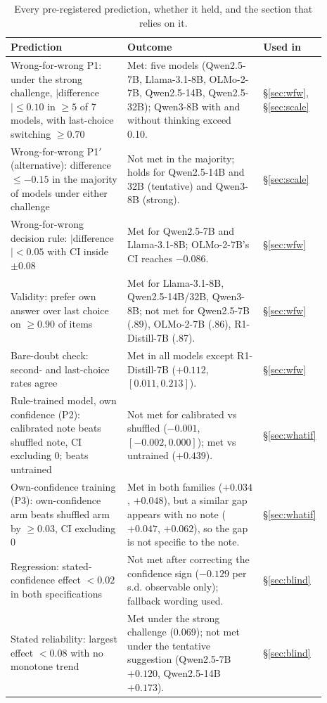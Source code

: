 \documentclass{article} %
\begin{document}
\begin{table}[!h]
\caption{Every pre-registered prediction, whether it held, and the section that relies on it.}
\label{tab:prereg}
\centering\scriptsize
\begin{tabular}{>{\raggedright\arraybackslash}p{0.37\linewidth}>{\raggedright\arraybackslash}p{0.43\linewidth}>{\raggedright\arraybackslash}p{0.09\linewidth}}
\toprule
Prediction & Outcome & Used in \\
\midrule
Wrong-for-wrong P1: under the strong challenge, $|$difference$|\le0.10$ in $\ge5$ of 7 models, with last-choice switching $\ge0.70$ & Met: five models (Qwen2.5-7B, Llama-3.1-8B, OLMo-2-7B, Qwen2.5-14B, Qwen2.5-32B); Qwen3-8B with and without thinking exceed 0.10. & \S\ref{sec:wfw}, \S\ref{sec:scale} \\
Wrong-for-wrong P1$'$ (alternative): difference $\le-0.15$ in the majority of models under either challenge & Not met in the majority; holds for Qwen2.5-14B and 32B (tentative) and Qwen3-8B (strong). & \S\ref{sec:scale} \\
Wrong-for-wrong decision rule: $|$difference$|<0.05$ with CI inside $\pm0.08$ & Met for Qwen2.5-7B and Llama-3.1-8B; OLMo-2-7B's CI reaches $-0.086$. & \S\ref{sec:wfw} \\
Validity: prefer own answer over last choice on $\ge0.90$ of items & Met for Llama-3.1-8B, Qwen2.5-14B/32B, Qwen3-8B; not met for Qwen2.5-7B (.89), OLMo-2-7B (.86), R1-Distill-7B (.87). & \S\ref{sec:wfw} \\
Bare-doubt check: second- and last-choice rates agree & Met in all models except R1-Distill-7B ($+0.112$, $[0.011, 0.213]$). & \S\ref{sec:wfw} \\
Rule-trained model, own confidence (P2): calibrated note beats shuffled note, CI excluding 0; beats untrained & Not met for calibrated vs shuffled ($-0.001$, $[-0.002, 0.000]$); met vs untrained ($+0.439$). & \S\ref{sec:whatif} \\
Own-confidence training (P3): own-confidence arm beats shuffled arm by $\ge0.03$, CI excluding 0 & Met in both families ($+0.034$, $+0.048$), but a similar gap appears with no note ($+0.047$, $+0.062$), so the gap is not specific to the note. & \S\ref{sec:whatif} \\
Regression: stated-confidence effect $<0.02$ in both specifications & Not met after correcting the confidence sign ($-0.129$ per s.d. observable only); fallback wording used. & \S\ref{sec:blind} \\
Stated reliability: largest effect $<0.08$ with no monotone trend & Met under the strong challenge (0.069); not met under the tentative suggestion (Qwen2.5-7B $+0.120$, Qwen2.5-14B $+0.173$). & \S\ref{sec:blind} \\

\end{tabular}
\end{table}
\end{document}

